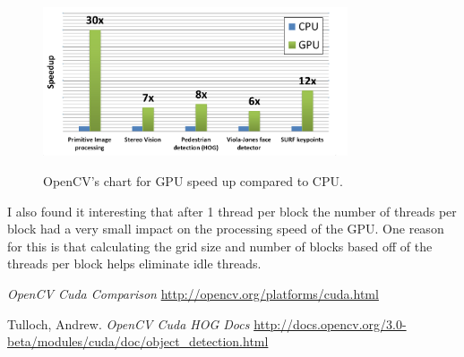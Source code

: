 \documentclass[journal]{IEEEtran}
\begin{document}
\begin{figure}[h]
\caption{OpenCV's chart for GPU speed up compared to CPU.}
\includegraphics[width=9cm]{opencvSpeed}
\label{fig:opencvSpeed}
\end{figure}


I also found it interesting that after 1 thread per block the number of threads per block had a very small impact on the processing speed of the GPU. One reason for this is that calculating the grid size and number of blocks based off of the threads per block helps eliminate idle threads.



\ifCLASSOPTIONcaptionsoff
  \newpage
\fi

\begin{thebibliography}{1}

  \emph{OpenCV Cuda Comparison} \url{http://opencv.org/platforms/cuda.html}

  Tulloch, Andrew. \emph{OpenCV Cuda HOG Docs} \url{http://docs.opencv.org/3.0-beta/modules/cuda/doc/object_detection.html}

\end{thebibliography}
\end{document}
